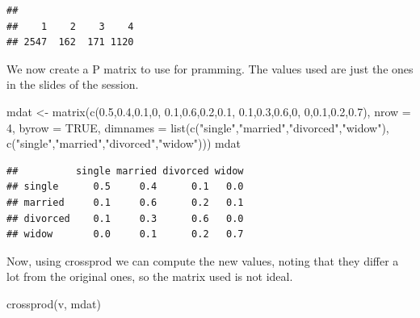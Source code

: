 \documentclass[
]{article}
\newenvironment{Shaded}{\begin{snugshade}}{\end{snugshade}}
\newcommand{\AttributeTok}[1]{\textcolor[rgb]{0.77,0.63,0.00}{#1}}
\newcommand{\ConstantTok}[1]{\textcolor[rgb]{0.00,0.00,0.00}{#1}}
\newcommand{\DecValTok}[1]{\textcolor[rgb]{0.00,0.00,0.81}{#1}}
\newcommand{\FloatTok}[1]{\textcolor[rgb]{0.00,0.00,0.81}{#1}}
\newcommand{\FunctionTok}[1]{\textcolor[rgb]{0.00,0.00,0.00}{#1}}
\newcommand{\NormalTok}[1]{#1}
\newcommand{\OtherTok}[1]{\textcolor[rgb]{0.56,0.35,0.01}{#1}}
\newcommand{\StringTok}[1]{\textcolor[rgb]{0.31,0.60,0.02}{#1}}
\begin{document}
\begin{verbatim}
## 
##    1    2    3    4 
## 2547  162  171 1120
\end{verbatim}

We now create a P matrix to use for pramming. The values used are just
the ones in the slides of the session.

\begin{Shaded}
\begin{Highlighting}[]
\NormalTok{mdat }\OtherTok{\textless{}{-}} \FunctionTok{matrix}\NormalTok{(}\FunctionTok{c}\NormalTok{(}\FloatTok{0.5}\NormalTok{,}\FloatTok{0.4}\NormalTok{,}\FloatTok{0.1}\NormalTok{,}\DecValTok{0}\NormalTok{,}
                 \FloatTok{0.1}\NormalTok{,}\FloatTok{0.6}\NormalTok{,}\FloatTok{0.2}\NormalTok{,}\FloatTok{0.1}\NormalTok{,}
                 \FloatTok{0.1}\NormalTok{,}\FloatTok{0.3}\NormalTok{,}\FloatTok{0.6}\NormalTok{,}\DecValTok{0}\NormalTok{,}
                 \DecValTok{0}\NormalTok{,}\FloatTok{0.1}\NormalTok{,}\FloatTok{0.2}\NormalTok{,}\FloatTok{0.7}\NormalTok{), }\AttributeTok{nrow =} \DecValTok{4}\NormalTok{, }\AttributeTok{byrow =} \ConstantTok{TRUE}\NormalTok{,}
               \AttributeTok{dimnames =} \FunctionTok{list}\NormalTok{(}\FunctionTok{c}\NormalTok{(}\StringTok{"single"}\NormalTok{,}\StringTok{"married"}\NormalTok{,}\StringTok{"divorced"}\NormalTok{,}\StringTok{"widow"}\NormalTok{),}
                               \FunctionTok{c}\NormalTok{(}\StringTok{"single"}\NormalTok{,}\StringTok{"married"}\NormalTok{,}\StringTok{"divorced"}\NormalTok{,}\StringTok{"widow"}\NormalTok{)))}
\NormalTok{mdat}
\end{Highlighting}
\end{Shaded}

\begin{verbatim}
##          single married divorced widow
## single      0.5     0.4      0.1   0.0
## married     0.1     0.6      0.2   0.1
## divorced    0.1     0.3      0.6   0.0
## widow       0.0     0.1      0.2   0.7
\end{verbatim}

Now, using crossprod we can compute the new values, noting that they
differ a lot from the original ones, so the matrix used is not ideal.

\begin{Shaded}
\begin{Highlighting}[]
\FunctionTok{crossprod}\NormalTok{(v, mdat)}
\end{Highlighting}
\end{Shaded}
\end{document}
